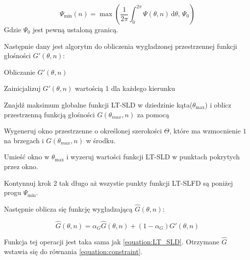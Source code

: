\begin{equation}
    \Psi_{\min}(n)=
    \max({\dfrac{1}{2\pi} \int_{0}^{2\pi} \Psi(\theta,n) \, \mathrm{d}\theta, \, \Psi_{0}})
\end{equation}
Gdzie $\Psi_{0}$ jest pewną ustaloną granicą.

\newpage

\noindent Następnie  dany jest algorytm do obliczenia wygładzonej przestrzennej funkcji głośności $G'(\theta,n)$:


\begin{algorithm}
  \label{alg:gprim}
  \caption{Obliczanie $G'(\theta,n)$}
  \begin{algorithmic}[1]
    \State Zainicjalizuj $G'(\theta,n)$ wartością 1 dla każdego kierunku
    
    \State  Znajdź maksimum globalne funkcji LT-SLD w dziedzinie kąta($\theta_{\max}$) i oblicz przestrzenną funkcją głośności $G(\theta_{max},n)$ za pomocą
    
    \State Wygeneruj okno przestrzenne o określonej szerokości $\Theta$, które ma wzmocnienie $1$ na brzegach i $G(\theta_{max},n)$ w środku.
    
    \State Umieść okno w $\theta_{\max}$ i wyzeruj wartości funkcji LT-SLD w punktach pokrytych przez okno.
    
    \State Kontynnuj krok 2 tak długo aż wszystie punkty funkcji LT-SLFD są poniżej progu $\Psi_{\min}$.
  \end{algorithmic}
\end{algorithm}

\noindent Następnie oblicza się funkcję wygładzającą $\widehat{G}(\theta,n)$:

\begin{equation}
    \label{equation:Ghat}
    \widehat{G}(\theta,n)=
    \alpha_{G}\widehat{G}(\theta,n)
    + (1-\alpha_{G})G'(\theta,n)
\end{equation}


\noindent Funkcja tej operacji jest taka sama jak \ref{equation:LT_SLD}. Otrzymane $\widehat{G}$ wstawia się do równania \ref{equation:constraint}.





